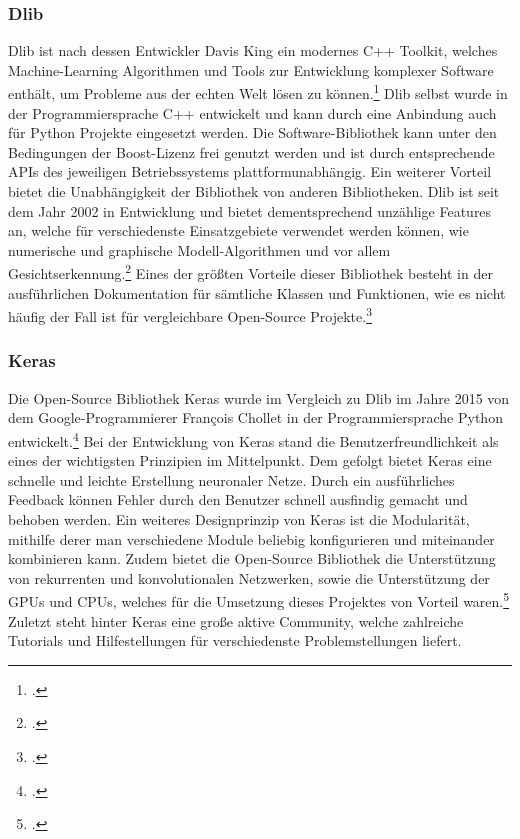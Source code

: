 \documentclass[12pt, a4paper]{report}
\begin{document}
\subsubsection{Dlib}
Dlib ist nach dessen Entwickler Davis King ein modernes C++ Toolkit, welches Machine-Learning Algorithmen und Tools zur Entwicklung komplexer Software enthält, um Probleme aus der echten Welt lösen zu können.\footcite[Vgl.]{netguru}
\newline
Dlib selbst wurde in der Programmiersprache C++ entwickelt und kann durch eine Anbindung auch für Python Projekte eingesetzt werden. Die Software-Bibliothek kann unter den Bedingungen der Boost-Lizenz frei genutzt werden und ist durch entsprechende APIs des jeweiligen Betriebssystems plattformunabhängig. Ein weiterer Vorteil bietet die Unabhängigkeit der Bibliothek von anderen Bibliotheken. %
Dlib ist seit dem Jahr 2002 in Entwicklung und bietet dementsprechend unzählige Features an, welche für verschiedenste Einsatzgebiete verwendet werden können, wie numerische und graphische Modell-Algorithmen und vor allem Gesichtserkennung.\footcite[Vgl.][]{netguru}
Eines der größten Vorteile dieser Bibliothek besteht in der ausführlichen Dokumentation für sämtliche Klassen und Funktionen, wie es nicht häufig der Fall ist für vergleichbare Open-Source Projekte.\footcite[Vgl.]{Dlib}

\subsubsection{Keras}
Die Open-Source Bibliothek Keras wurde im Vergleich zu Dlib im Jahre 2015 von dem Google-Programmierer François Chollet in der Programmiersprache Python entwickelt.\footcite[Vgl.]{Keras}
Bei der Entwicklung von Keras stand die Benutzerfreundlichkeit als eines der wichtigsten Prinzipien im Mittelpunkt. Dem gefolgt bietet Keras eine schnelle und leichte Erstellung neuronaler Netze. Durch ein ausführliches Feedback können Fehler durch den Benutzer schnell ausfindig gemacht und behoben werden. Ein weiteres Designprinzip von Keras ist die Modularität, mithilfe derer man verschiedene Module beliebig konfigurieren und miteinander kombinieren kann. Zudem bietet die Open-Source Bibliothek die Unterstützung von rekurrenten und konvolutionalen Netzwerken, sowie die Unterstützung der GPUs und CPUs, welches für die Umsetzung dieses Projektes von Vorteil waren.\footcite[Vgl.]{Keras2}
Zuletzt steht hinter Keras eine große aktive Community, welche zahlreiche Tutorials und Hilfestellungen für verschiedenste Problemstellungen liefert.
\end{document}
